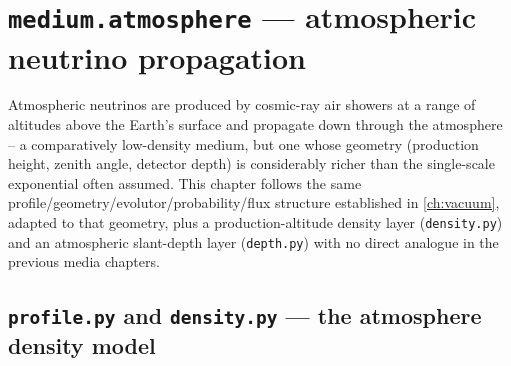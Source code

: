 \chapter{\texttt{medium.atmosphere} --- atmospheric neutrino propagation}
\label{ch:atmosphere}

Atmospheric neutrinos are produced by cosmic-ray air showers at a range of
altitudes above the Earth's surface and propagate down through the
atmosphere -- a comparatively low-density medium, but one whose geometry
(production height, zenith angle, detector depth) is considerably richer
than the single-scale exponential often assumed. This chapter follows the
same profile/geometry/evolutor/probability/flux structure established in
\cref{ch:vacuum}, adapted to that geometry, plus a
production-altitude density layer (\texttt{density.py}) and an atmospheric
slant-depth layer (\texttt{depth.py}) with no direct analogue in the
previous media chapters.

\section{\texttt{profile.py} and \texttt{density.py} --- the atmosphere density model}
\label{sec:atmosphere-profile}


